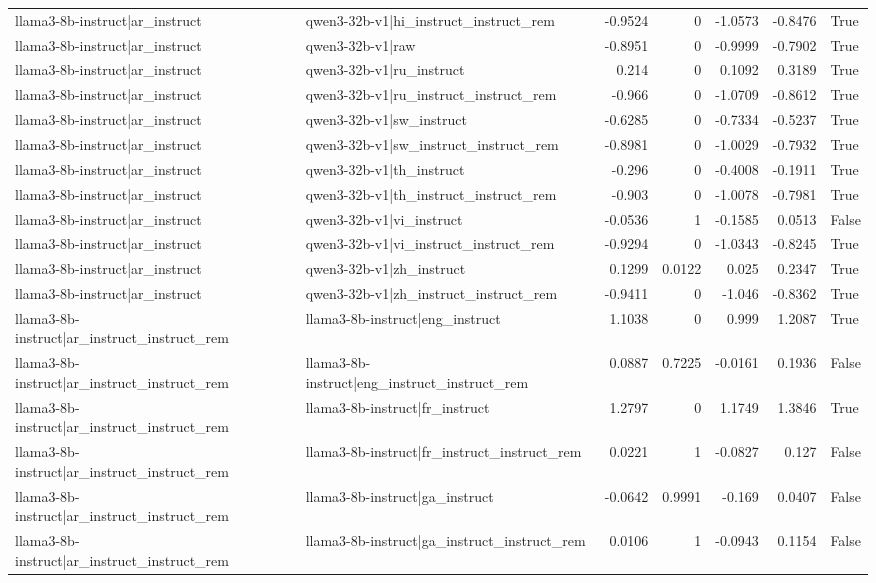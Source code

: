 \begin{table}
\begin{tabular}{l l r r r r l}
llama3-8b-instruct|ar_instruct & qwen3-32b-v1|hi_instruct_instruct_rem & -0.9524 & 0 & -1.0573 & -0.8476 & True \\
llama3-8b-instruct|ar_instruct & qwen3-32b-v1|raw & -0.8951 & 0 & -0.9999 & -0.7902 & True \\
llama3-8b-instruct|ar_instruct & qwen3-32b-v1|ru_instruct & 0.214 & 0 & 0.1092 & 0.3189 & True \\
llama3-8b-instruct|ar_instruct & qwen3-32b-v1|ru_instruct_instruct_rem & -0.966 & 0 & -1.0709 & -0.8612 & True \\
llama3-8b-instruct|ar_instruct & qwen3-32b-v1|sw_instruct & -0.6285 & 0 & -0.7334 & -0.5237 & True \\
llama3-8b-instruct|ar_instruct & qwen3-32b-v1|sw_instruct_instruct_rem & -0.8981 & 0 & -1.0029 & -0.7932 & True \\
llama3-8b-instruct|ar_instruct & qwen3-32b-v1|th_instruct & -0.296 & 0 & -0.4008 & -0.1911 & True \\
llama3-8b-instruct|ar_instruct & qwen3-32b-v1|th_instruct_instruct_rem & -0.903 & 0 & -1.0078 & -0.7981 & True \\
llama3-8b-instruct|ar_instruct & qwen3-32b-v1|vi_instruct & -0.0536 & 1 & -0.1585 & 0.0513 & False \\
llama3-8b-instruct|ar_instruct & qwen3-32b-v1|vi_instruct_instruct_rem & -0.9294 & 0 & -1.0343 & -0.8245 & True \\
llama3-8b-instruct|ar_instruct & qwen3-32b-v1|zh_instruct & 0.1299 & 0.0122 & 0.025 & 0.2347 & True \\
llama3-8b-instruct|ar_instruct & qwen3-32b-v1|zh_instruct_instruct_rem & -0.9411 & 0 & -1.046 & -0.8362 & True \\
llama3-8b-instruct|ar_instruct_instruct_rem & llama3-8b-instruct|eng_instruct & 1.1038 & 0 & 0.999 & 1.2087 & True \\
llama3-8b-instruct|ar_instruct_instruct_rem & llama3-8b-instruct|eng_instruct_instruct_rem & 0.0887 & 0.7225 & -0.0161 & 0.1936 & False \\
llama3-8b-instruct|ar_instruct_instruct_rem & llama3-8b-instruct|fr_instruct & 1.2797 & 0 & 1.1749 & 1.3846 & True \\
llama3-8b-instruct|ar_instruct_instruct_rem & llama3-8b-instruct|fr_instruct_instruct_rem & 0.0221 & 1 & -0.0827 & 0.127 & False \\
llama3-8b-instruct|ar_instruct_instruct_rem & llama3-8b-instruct|ga_instruct & -0.0642 & 0.9991 & -0.169 & 0.0407 & False \\
llama3-8b-instruct|ar_instruct_instruct_rem & llama3-8b-instruct|ga_instruct_instruct_rem & 0.0106 & 1 & -0.0943 & 0.1154 & False \\

\end{tabular}
\end{table}
